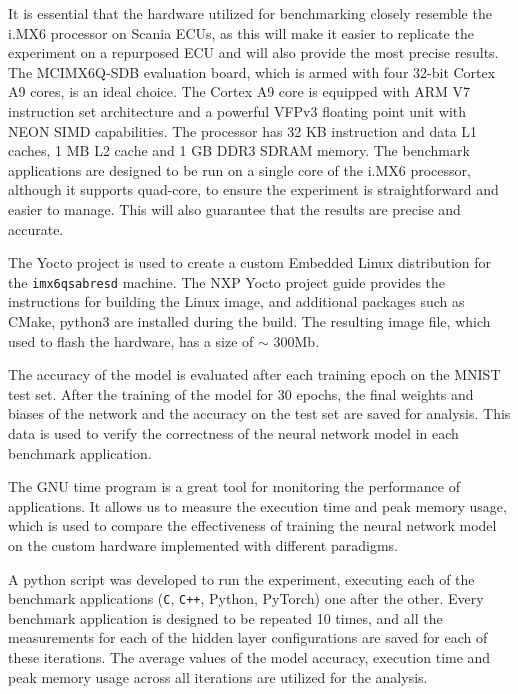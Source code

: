 It is essential that the hardware utilized for benchmarking closely resemble the i.MX6 processor on Scania ECUs, as this will make it easier to replicate the experiment on a repurposed ECU and will also provide the most precise results. The MCIMX6Q-SDB evaluation board, which is armed with four 32-bit Cortex A9 cores, is an ideal choice. The Cortex A9 core is equipped with ARM V7 instruction set architecture and a powerful VFPv3 floating point unit with NEON SIMD capabilities. The processor has 32 KB instruction and data L1 caches, 1 MB L2 cache and 1 GB DDR3 SDRAM memory. The benchmark applications are designed to be run on a single core of the i.MX6 processor, although it supports quad-core, to ensure the experiment is straightforward and easier to manage. This will also guarantee that the results are precise and accurate.

The Yocto project is used to create a custom Embedded Linux distribution for the \texttt{imx6qsabresd} machine. The NXP Yocto project guide \cite{nxp-yocto} provides the instructions for building the Linux image, and additional packages such as CMake, python3 are installed during the build. The resulting image file, which used to flash the hardware, has a size of $\sim$ 300Mb.

The accuracy of the model is evaluated after each training epoch on the MNIST test set. After the training of the model for 30 epochs, the final weights and biases of the network and the accuracy on the test set are saved for analysis. This data is used to verify the correctness of the neural network model in each benchmark application.

The GNU time program is a great tool for monitoring the performance of applications. It allows us to measure the execution time and peak memory usage, which is used to compare the effectiveness of training the neural network model on the custom hardware implemented with different paradigms.

A python script was developed to run the experiment, executing each of the benchmark applications (\texttt{C}, \texttt{C++}, Python, PyTorch) one after the other. Every benchmark application is designed to be repeated 10 times, and all the measurements for each of the hidden layer configurations are saved for each of these iterations. The average values of the model accuracy, execution time and peak memory usage across all iterations are utilized for the analysis.


